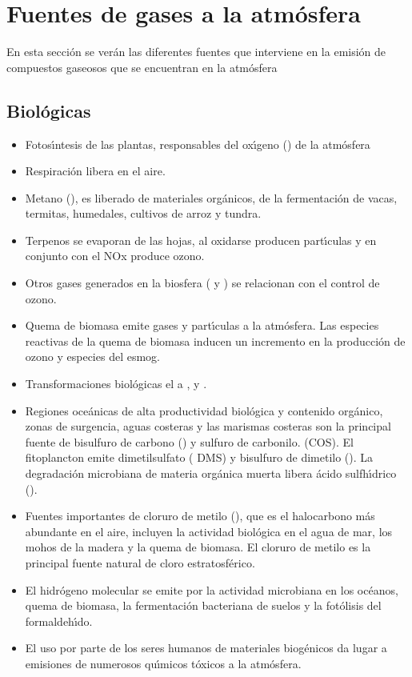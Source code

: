 \section{Fuentes de gases a la atmósfera}

En esta sección se verán las diferentes fuentes que interviene en la emisión de compuestos gaseosos que se encuentran en la atmósfera

\subsection{Biológicas}\label{subbio}
\begin{itemize}
\item Fotos\'{\i}ntesis de las plantas, responsables del ox\'{\i}geno () de la atmósfera
\item  Respiración libera  en el aire.
\item  Metano (), es liberado de materiales orgánicos, de la fermentación de vacas, termitas, humedales, cultivos de arroz y tundra.
\item  Terpenos  se evaporan de las hojas, al oxidarse producen part\'{\i}culas y en conjunto con el NOx produce ozono. 
\item Otros gases generados en la biosfera ( y ) se relacionan con el control de ozono.
\item Quema de biomasa emite gases y part\'{\i}culas a la atmósfera. Las especies reactivas de la quema de biomasa inducen un incremento en la producción de ozono y especies del esmog.
\item  Transformaciones biológicas el  a ,  y .
\item Regiones oceánicas de alta productividad biológica y contenido orgánico, zonas de surgencia, aguas costeras y las marismas costeras son la principal fuente de bisulfuro de carbono ()  y sulfuro de carbonilo. (COS). El fitoplancton emite dimetilsulfato ( DMS) y bisulfuro de dimetilo (). La degradación microbiana de materia orgánica muerta libera ácido sulfh\'{\i}drico ().
\item Fuentes importantes de cloruro de metilo (), que es el halocarbono más abundante en el aire, incluyen la actividad biológica en el agua de mar, los mohos de la madera y la quema de biomasa. El cloruro de metilo es la principal fuente natural de cloro estratosférico.
\item El hidrógeno molecular se emite por la actividad microbiana en los océanos, quema de biomasa, la fermentación bacteriana de suelos y la fotólisis del formaldeh\'{\i}do.
\item El uso por parte de los seres humanos de materiales biogénicos da lugar a emisiones de numerosos qu\'{\i}micos tóxicos a la atmósfera.
\end{itemize}
